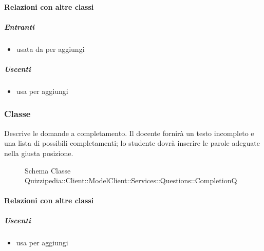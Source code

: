 \paragraph{Relazioni con altre classi}
\subparagraph{Entranti}
\begin{itemize}
\item usata da  per aggiungi
\end{itemize}
\subparagraph{Uscenti}
\begin{itemize}
\item usa  per aggiungi
\end{itemize}
\subsubsection{Classe }
Descrive le domande a completamento. Il docente fornirà un testo incompleto e una lista di possibili completamenti; lo studente dovrà inserire le parole adeguate nella giusta posizione.
\begin{figure}[H]
\centering
\noindent{}
\caption[Schema Classe CompletionQ]{Schema Classe Quizzipedia::Client::ModelClient::Services::Questions::CompletionQ}
\end{figure}
\paragraph{Relazioni con altre classi}
\subparagraph{Uscenti}
\begin{itemize}
\item usa  per aggiungi
\end{itemize}
